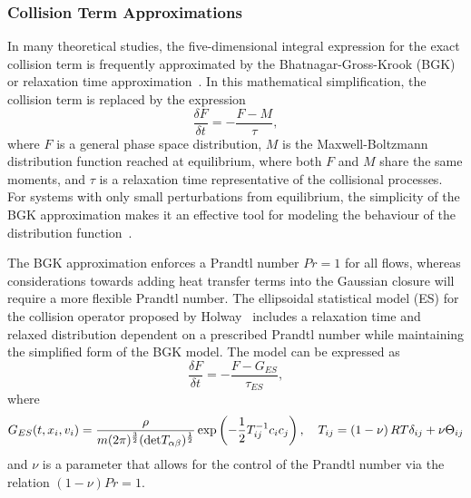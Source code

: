 \documentclass[titlepage,11pt,letterpaper]{article}
\begin{document}
\subsubsection{Collision Term Approximations}
In many theoretical studies, the five-dimensional integral expression for the exact 
collision term is frequently approximated by the Bhatnagar-Gross-Krook (BGK) or relaxation 
time approximation~\cite{bhatnagar:1954}. In this mathematical simplification, the collision 
term is replaced by the expression
%
\begin{equation}\label{eq:BGK}
\frac{\delta F}{\delta t} = -\frac{F - \mathit{M}}{\tau},
\end{equation}
%
where $F$ is a general phase space distribution, $M$ is the Maxwell-Boltzmann distribution 
function reached at equilibrium, where both $F$ and $M$ share the same moments, and $\tau$ 
is a relaxation time representative of the collisional processes. For systems with only 
small perturbations from equilibrium, the simplicity of the BGK approximation makes it an 
effective tool for modeling the behaviour of the distribution function~\cite{bird:1976}.

The BGK approximation enforces a Prandtl number $Pr=1$ for all flows, whereas considerations 
towards adding heat transfer terms into the Gaussian closure will require a more flexible 
Prandtl number. The ellipsoidal statistical model (ES) for the collision operator proposed by 
Holway~\cite{holway:1966} includes a relaxation time and relaxed distribution dependent on 
a prescribed Prandtl number while maintaining the simplified form of the BGK model. The 
model can be expressed as
%
\begin{equation}\label{eq:ES}
\frac{\delta F}{\delta t} = -\frac{F - \mathit{G}_{ES}}{\tau_{ES}},
\end{equation}
%
where
%
\begin{equation}\label{eq:ES_GES}
G_{ES}(t,x_i,v_i)=\frac{\rho}{m(2\pi)^\frac{3}{2}(\textup{det} 
T_{\alpha \beta})^\frac{1}{2}}\exp \left(-\frac{1}{2}T_{ij}^{-1}c_{i}c_{j} \right), \quad
T_{ij}=\left(1-\nu\right)RT\delta_{ij}+\nu \Theta_{ij}
\end{equation}
%
and $\nu$ is a parameter that allows for the control of the Prandtl number via the relation 
$(1-\nu)Pr=1$.
\end{document}
